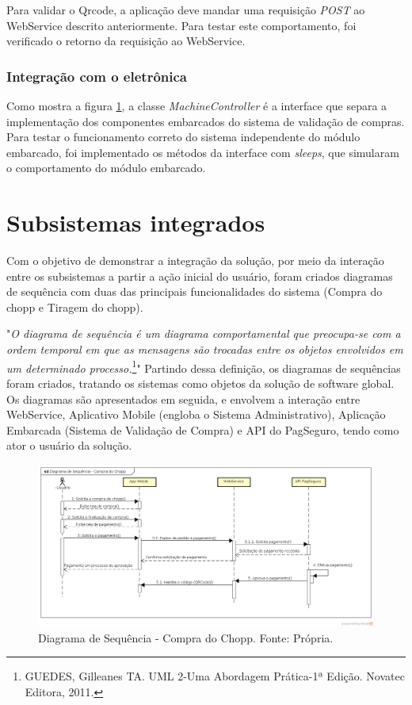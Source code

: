 Para validar o Qrcode, a aplicação deve mandar uma requisição \textit{POST} ao WebService descrito anteriormente.
Para testar este comportamento, foi verificado o retorno da requisição ao WebService.

\subsubsection{Integração com o eletrônica}

Como mostra a figura \ref{classes-kivy}, a classe \textit{MachineController} é a interface que separa
a implementação dos componentes embarcados do sistema de validação de compras. Para testar o funcionamento
correto do sistema independente do módulo embarcado, foi implementado os métodos da interface com
\textit{sleeps}, que simularam o comportamento do módulo embarcado.

\section{Subsistemas integrados}

Com o objetivo de demonstrar a integração da solução, por meio da interação entre os subsistemas a partir a ação inicial 
do usuário, foram criados diagramas de sequência com duas das principais funcionalidades do sistema (Compra do chopp e 
Tiragem do chopp).


"\textit{O diagrama de sequência é um diagrama comportamental que preocupa-se com a ordem temporal em que as mensagens 
são trocadas entre os objetos envolvidos em um determinado processo.}\footnote{GUEDES, Gilleanes TA. UML 2-Uma Abordagem 
Prática-1ª Edição. Novatec Editora, 2011.}" Partindo dessa definição, os diagramas de sequências 
foram criados, tratando os sistemas como objetos da solução de software global. Os diagramas são apresentados em seguida, 
e envolvem a interação entre WebService, Aplicativo Mobile (engloba o Sistema Administrativo), Aplicação Embarcada (Sistema de 
Validação de Compra) e API do PagSeguro, tendo como ator o usuário da solução.


\begin{figure}[!htb]
    \centering
    \includegraphics[scale= 0.4]{figuras/Diagrama-de-Sequencia-Compra-do-Chopp.png}        
    \caption{Diagrama de Sequência - Compra do Chopp. Fonte: Própria.}
    \label{classes-kivy}
\end{figure}

